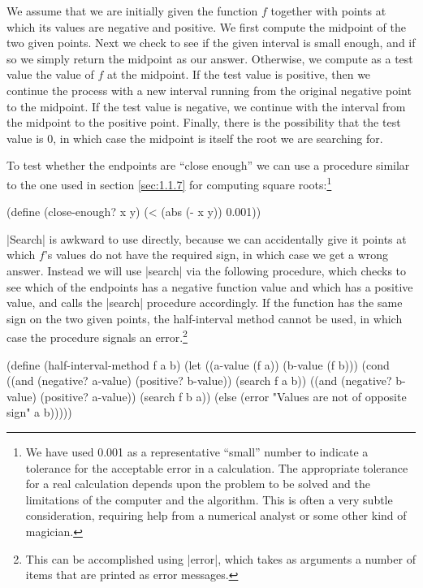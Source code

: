 We assume that we are initially given the function $f$ together with
points at which its values are negative and positive.  We first
compute the midpoint of the two given points.  Next we check to see if
the given interval is small enough, and if so we simply return the
midpoint as our answer.  Otherwise, we compute as a test value the
value of $f$ at the midpoint.  If the test value is positive, then we
continue the process with a new interval running from the original
negative point to the midpoint.  If the test value is negative, we
continue with the interval from the midpoint to the positive point.
Finally, there is the possibility that the test value is 0, in which
case the midpoint is itself the root we are searching for.


To test whether the endpoints are ``close enough'' we can use a
procedure similar to the one used in section \ref{sec:1.1.7} for
computing square roots:\footnote{We have used 0.001 as a
  representative ``small'' number to indicate a tolerance for the
  acceptable error in a calculation.  The appropriate tolerance for a
  real calculation depends upon the problem to be solved and the
  limitations of the computer and the algorithm.  This is often a very
  subtle consideration, requiring help from a numerical analyst or
  some other kind of magician.}

\begin{schemedisplay}
(define (close-enough? x y)
  (< (abs (- x y)) 0.001))
\end{schemedisplay}

\scheme|Search| is awkward to use directly, because we can
accidentally give it points at which $f$'s values do not have the
required sign, in which case we get a wrong answer.  Instead we will
use \scheme|search| via the following procedure, which checks to see
which of the endpoints has a negative function value and which has a
positive value, and calls the \scheme|search| procedure accordingly.
If the function has the same sign on the two given points, the
half-interval method cannot be used, in which case the procedure
signals an error.\footnote{This can be accomplished using
  \scheme|error|, which takes as arguments a number of items that are
  printed as error messages.}

\begin{schemedisplay}
(define (half-interval-method f a b)
  (let ((a-value (f a))
        (b-value (f b)))
    (cond ((and (negative? a-value) (positive? b-value))
           (search f a b))
          ((and (negative? b-value) (positive? a-value))
           (search f b a))
          (else
           (error "Values are not of opposite sign" a b)))))
\end{schemedisplay}

